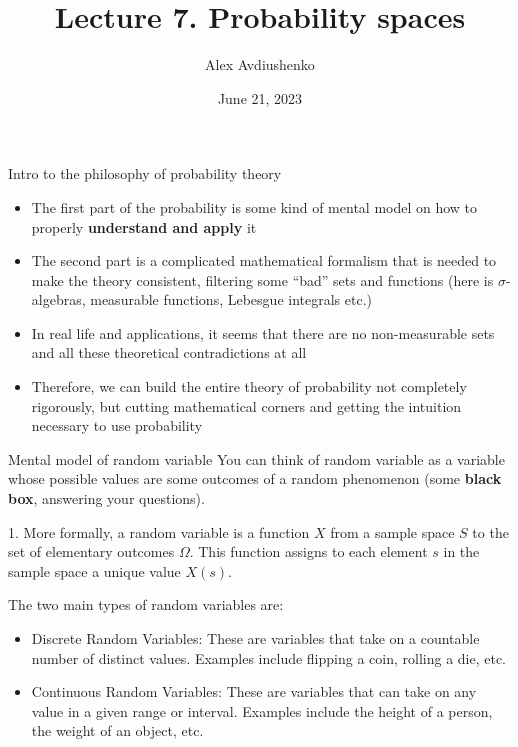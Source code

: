 \documentclass[fullscreen=true, bookmarks=true, hyperref={pdfencoding=unicode}]{beamer}
\title{Lecture 7. Probability spaces}
\author{Alex Avdiushenko}
\institute{Neapolis University Paphos}
\date{June 21, 2023}
\begin{document}
\begin{frame}
\transdissolve[duration=0.2]
\titlepage
\end{frame}


\begin{frame}{Intro to the philosophy of probability theory}
  \begin{itemize}
    \item The first part of the probability is some kind of mental model 
    on how to properly \textbf{understand and apply} it
    \item The second part is a complicated mathematical formalism 
    that is needed to make the theory consistent, filtering some ``bad'' sets and functions
    (here is $\sigma$-algebras, measurable functions, Lebesgue integrals etc.)
    \pause
    \item In real life and applications, it seems that there 
    are no non-measurable sets and all these theoretical contradictions at all
    \item Therefore, we can build the entire theory of probability 
    not completely rigorously, but cutting mathematical corners and 
    getting the intuition necessary to use probability
  \end{itemize}
\end{frame}


\begin{frame}{Mental model of random variable}
  You can think of random variable as a variable whose possible values 
  are some outcomes of a random phenomenon 
  (some \textbf{black box}, answering your questions).
  
  \vspace{0.5cm}
  1. More formally, a random variable is a function $X$ from 
  a sample space $S$ to the set of elementary outcomes $\Omega$. 
  This function assigns to each element $s$ in the sample space 
  a unique value $X(s)$.
  
  \vspace{0.5cm}
  \pause
  The two main types of random variables are:
  \begin{itemize}
    \pause
    \item Discrete Random Variables: These are variables that take on a countable number of distinct values. Examples include flipping a coin, rolling a die, etc.
    \pause
    \item Continuous Random Variables: These are variables that can take on any value in a given range or interval. Examples include the height of a person, the weight of an object, etc.
  \end{itemize}  
\end{frame}
\end{document}
